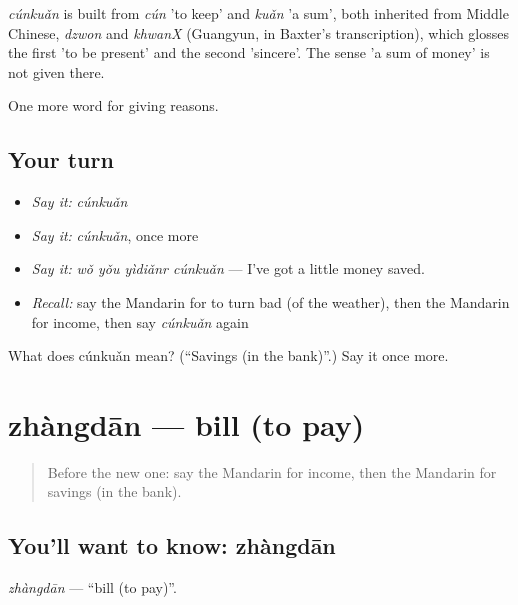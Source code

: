 \begin{cousinweb}
\emph{cúnkuǎn} is built from \emph{cún} 'to keep' and \emph{kuǎn} 'a sum', both inherited from Middle Chinese, \emph{dzwon} and \emph{khwanX} (Guangyun, in Baxter's transcription), which glosses the first 'to be present' and the second 'sincere'. The sense 'a sum of money' is not given there.
\end{cousinweb}

\begin{grammarlens}[title={What you've built}]
One more word for giving reasons.
\end{grammarlens}

\subsection*{Your turn}
\begin{itemize}
\raggedright
  \item \emph{Say it:} \emph{cúnkuǎn}
  \item \emph{Say it:} \emph{cúnkuǎn}, once more
  \item \emph{Say it:} \emph{wǒ yǒu yìdiǎnr cúnkuǎn} — I've got a little money saved.
  \item \emph{Recall:} say the Mandarin for to turn bad (of the weather), then the Mandarin for income, then say \emph{cúnkuǎn} again
\end{itemize}

\begin{tcolorbox}[breakable,colback=teal!4,colframe=teal!35!black,title={Before you move on}]
What does cúnkuǎn mean? (\textquotedblleft{}Savings (in the bank)\textquotedblright{}.) Say it once more.
\end{tcolorbox}
\section[zhàngdān]{zhàngdān — bill (to pay)}

\label{lesson:ZH-C387-zhangdan}



\begin{quote}
Before the new one: say the Mandarin for income, then the Mandarin for savings (in the bank).
\end{quote}

\subsection*{You'll want to know: zhàngdān}
\emph{zhàngdān} — \textquotedblleft{}bill (to pay)\textquotedblright{}.

